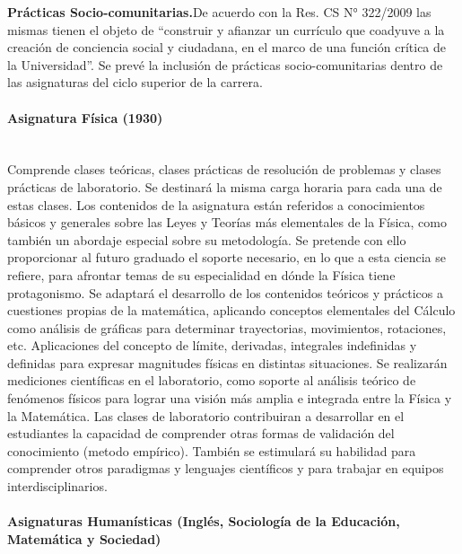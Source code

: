 \documentclass[a4paper, 12pt]{article}
\begin{document}
\begin{description}
\item{\textbf{Prácticas Socio-comunitarias.}}De acuerdo
con la Res. CS N° 322/2009 las mismas tienen el objeto de ``construir y afianzar un currículo que coadyuve a la creación de conciencia social y
ciudadana, en el marco de una función crítica de la Universidad''. Se prevé la inclusión de  prácticas socio-comunitarias  dentro de las
asignaturas del ciclo superior de la carrera.
\end{description}


\paragraph{Asignatura Física (1930)}\mbox{}\\

Comprende clases teóricas, clases prácticas  de resolución de problemas y clases prácticas de laboratorio. Se destinará la misma carga horaria  para cada una de estas clases. Los contenidos de la asignatura están referidos a conocimientos básicos y generales sobre las Leyes y Teorías más elementales de la Física, como también un abordaje especial sobre su metodología. Se pretende con ello proporcionar al futuro graduado el soporte necesario, en lo que a esta ciencia se refiere, para afrontar temas de su especialidad en dónde la Física tiene protagonismo. Se adaptará el desarrollo de los contenidos teóricos y prácticos a cuestiones propias de la matemática, aplicando conceptos elementales del Cálculo como análisis de gráficas para determinar trayectorias, movimientos, rotaciones, etc. Aplicaciones del concepto de límite, derivadas, integrales indefinidas y definidas para expresar magnitudes físicas en distintas situaciones. Se realizarán  mediciones científicas en el laboratorio, como soporte al análisis teórico de fenómenos físicos para lograr una visión más amplia e integrada entre la Física y la Matemática.   Las clases de laboratorio contribuiran a desarrollar en el estudiantes la capacidad de  comprender otras formas de validación del conocimiento (metodo empírico). También se estimulará su habilidad para comprender otros paradigmas y lenguajes científicos y para trabajar en equipos interdisciplinarios.
 

\paragraph{Asignaturas Humanísticas (Inglés, Sociología de la Educación, Matemática y Sociedad)}\mbox{}\\
\end{document}
